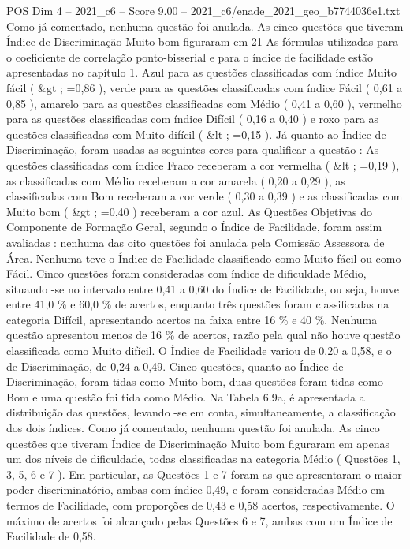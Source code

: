 \begin{textsample}{POS Dim 4 – 2021\_c6 – Score 9.00 – 2021\_c6/enade\_2021\_geo\_b7744036e1.txt}
Como já comentado, nenhuma questão foi anulada.
As cinco questões que tiveram Índice de Discriminação Muito bom figuraram em 21 As fórmulas utilizadas para o coeficiente de correlação ponto-bisserial e para o índice de facilidade estão apresentadas no capítulo 1.
Azul para as questões classificadas com índice Muito fácil ( \&gt ; =0,86 ), verde para as questões classificadas com índice Fácil ( 0,61 a 0,85 ), amarelo para as questões classificadas com Médio ( 0,41 a 0,60 ), vermelho para as questões classificadas com índice Difícil ( 0,16 a 0,40 ) e roxo para as questões classificadas com Muito difícil ( \&lt ; =0,15 ).
Já quanto ao Índice de Discriminação, foram usadas as seguintes cores para qualificar a questão : As questões classificadas com índice Fraco receberam a cor vermelha ( \&lt ; =0,19 ), as classificadas com Médio receberam a cor amarela ( 0,20 a 0,29 ), as classificadas com Bom receberam a cor verde ( 0,30 a 0,39 ) e as classificadas com Muito bom ( \&gt ; =0,40 ) receberam a cor azul.
As Questões Objetivas do Componente de Formação Geral, segundo o Índice de Facilidade, foram assim avaliadas : nenhuma das oito questões foi anulada pela Comissão Assessora de Área.
Nenhuma teve o Índice de Facilidade classificado como Muito fácil ou como Fácil.
Cinco questões foram consideradas com índice de dificuldade Médio, situando -se no intervalo entre 0,41 a 0,60 do Índice de Facilidade, ou seja, houve entre 41,0 \% e 60,0 \% de acertos, enquanto três questões foram classificadas na categoria Difícil, apresentando acertos na faixa entre 16 \% e 40 \%.
Nenhuma questão apresentou menos de 16 \% de acertos, razão pela qual não houve questão classificada como Muito difícil.
O Índice de Facilidade variou de 0,20 a 0,58, e o de Discriminação, de 0,24 a 0,49.
Cinco questões, quanto ao Índice de Discriminação, foram tidas como Muito bom, duas questões foram tidas como Bom e uma questão foi tida como Médio.
Na Tabela 6.9a, é apresentada a distribuição das questões, levando -se em conta, simultaneamente, a classificação dos dois índices.
Como já comentado, nenhuma questão foi anulada.
As cinco questões que tiveram Índice de Discriminação Muito bom figuraram em apenas um dos níveis de dificuldade, todas classificadas na categoria Médio ( Questões 1, 3, 5, 6 e 7 ).
Em particular, as Questões 1 e 7 foram as que apresentaram o maior poder discriminatório, ambas com índice 0,49, e foram consideradas Médio em termos de Facilidade, com proporções de 0,43 e 0,58 acertos, respectivamente.
O máximo de acertos foi alcançado pelas Questões 6 e 7, ambas com um Índice de Facilidade de 0,58.

\end{textsample}
